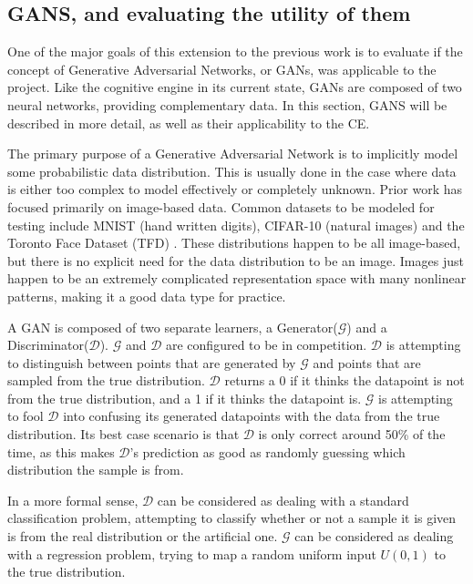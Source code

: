	\subsection {GANS, and evaluating the utility of them}
	\par One of the major goals of this extension to the previous work is to evaluate if the concept of Generative Adversarial Networks, or GANs, was applicable to the project. Like the cognitive engine in its current state, GANs are composed of two neural networks, providing complementary data. In this section, GANS will be described in more detail, as well as their applicability to the CE.  
	\par The primary purpose of a Generative Adversarial Network is to implicitly model some probabilistic data distribution. This is usually done in the case where data is either too complex to model effectively or completely unknown. Prior work has focused primarily on image-based data. Common datasets to be modeled for testing include MNIST (hand written digits), CIFAR-10 (natural images) and the Toronto Face Dataset (TFD) \cite{gan_overview}. These distributions happen to be all image-based, but there is no explicit need for the data distribution to be an image. Images just happen to be an extremely complicated representation space with many nonlinear patterns, making it a good data type for practice.
	\par A GAN is composed of two separate learners, a Generator($\mathcal{G}$) and a Discriminator($\mathcal{D}$). $\mathcal{G}$ and $\mathcal{D}$ are configured to be in competition. $\mathcal{D}$ is attempting to distinguish between points that are generated by $\mathcal{G}$ and points that are sampled from the true distribution. $\mathcal{D}$ returns a 0 if it thinks the datapoint is not from the true distribution, and a 1 if it thinks the datapoint is. $\mathcal{G}$ is attempting to fool $\mathcal{D}$ into confusing its generated datapoints with the data from the true distribution. Its best case scenario is that $\mathcal{D}$ is only correct around 50\% of the time, as this makes $\mathcal{D}$'s prediction as good as randomly guessing which distribution the sample is from.
	\par In a more formal sense, $\mathcal{D}$ can be considered as dealing with a standard classification problem, attempting to classify whether or not a sample it is given is from the real distribution or the artificial one. $\mathcal{G}$ can be considered as dealing with a regression problem, trying to map a random uniform input $U(0,1)$ to the true distribution. 
